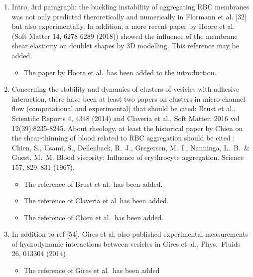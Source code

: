\documentclass[11pt]{article}
\newcommand{\comment}[1]{{\color{blue} #1}}
\begin{document}
\begin{enumerate}
\item\comment{Intro, 3rd paragraph: the buckling instability of aggregating RBC
membranes was not only predicted theroretically and numerically in
Flormann et al. [32] but also experimentally. In addition, a more
recent paper by Hoore et al. (Soft Matter 14, 6278-6289 (2018)) showed
the influence of the membrane shear elasticity on doublet shapes by 3D
modelling. This reference may be added.}
\begin{itemize}
  \item The paper by Hoore et al.~has been added to the introduction.
\end{itemize}

\item\comment{Concerning the stability and dynamics of clusters of vesicles with
adhesive interaction, there have been at least two papers on clusters
in micro-channel flow (computational and experimental) that should be
cited: Brust et al., Scientific Reports 4, 4348 (2014) and Claveria et
al., Soft Matter. 2016 vol 12(39):8235-8245. About rheology, at least
the historical paper by Chien on the shear-thinning of blood related
to RBC aggregation should be cited : Chien, S., Usami, S., Dellenback,
R.~J., Gregersen, M.~I., Nanninga, L.~B.~\& Guest, M.~M. Blood
viscosity: Influence of erythrocyte aggregation. Science 157, 829–831
(1967).}
\begin{itemize}
  \item The reference of Brust et al.~has been added.
  \item The reference of Claveria et al~has been added.
  \item The reference of Chien et al.~has been added.
\end{itemize}

\item\comment{In addition to ref [54], Gires et al. also published experimental
measurements of hydrodynamic interactions between vesicles in Gires et
al., Phys.~Fluids 26, 013304 (2014)}
\begin{itemize}
  \item The reference of Gires et al.~has been added
\end{itemize}


\end{enumerate}
\end{document}
